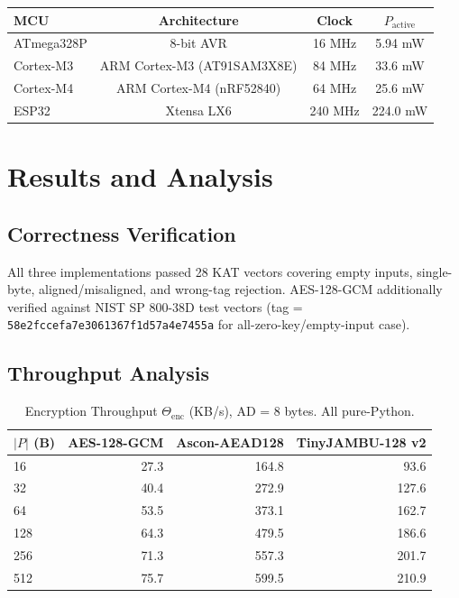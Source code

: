 \documentclass[11pt,a4paper]{article}
\begin{document}
\begin{center}
\begin{tabular}{lccc}
\toprule
\textbf{MCU} & \textbf{Architecture} & \textbf{Clock} & \textbf{$P_{\text{active}}$} \\
\midrule
ATmega328P & 8-bit AVR & 16 MHz & 5.94 mW \\
Cortex-M3 & ARM Cortex-M3 (AT91SAM3X8E) & 84 MHz & 33.6 mW \\
Cortex-M4 & ARM Cortex-M4 (nRF52840) & 64 MHz & 25.6 mW \\
ESP32 & Xtensa LX6 & 240 MHz & 224.0 mW \\
\bottomrule
\end{tabular}
\end{center}

\section{Results and Analysis}

\subsection{Correctness Verification}

All three implementations passed 28 KAT vectors covering empty inputs, single-byte, aligned/misaligned, and wrong-tag rejection. AES-128-GCM additionally verified against NIST SP 800-38D test vectors (tag = \texttt{58e2fccefa7e3061367f1d57a4e7455a} for all-zero-key/empty-input case).

\subsection{Throughput Analysis}

\begin{table}[H]
\centering
\caption{Encryption Throughput $\Theta_{\text{enc}}$ (KB/s), AD = 8 bytes. All pure-Python.}
\label{tab:throughput}
\begin{tabular}{lrrr}
\toprule
\textbf{$|P|$ (B)} & \textbf{AES-128-GCM} & \textbf{Ascon-AEAD128} & \textbf{TinyJAMBU-128 v2} \\
\midrule
16  & 27.3 & 164.8 & 93.6 \\
32  & 40.4 & 272.9 & 127.6 \\
64  & 53.5 & 373.1 & 162.7 \\
128 & 64.3 & 479.5 & 186.6 \\
256 & 71.3 & 557.3 & 201.7 \\
512 & 75.7 & 599.5 & 210.9 \\
\bottomrule
\end{tabular}
\end{table}
\end{document}
